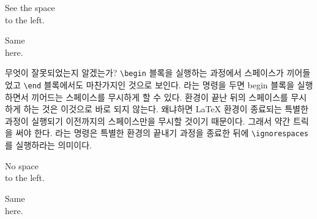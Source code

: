 
\begin{example}
\newenvironment{simple}%
 {\noindent}%
 {\par\noindent}

\begin{simple}
See the space\\to the left.
\end{simple}
Same\\here.
\end{example}

\noindent 무엇이 잘못되었는지 알겠는가? \verb|\begin| 블록을 실행하는 과정에서 스페이스가 끼어들었고 \verb|\end| 블록에서도 마찬가지인 것으로 보인다.
라는 명령을 두면 begin 블록을 실행하면서 끼어드는 스페이스를 무시하게 할 수 있다. 환경이 끝난 뒤의 스페이스를 무시하게 하는 것은 이것으로 바로 되지 않는다. 왜냐하면 \LaTeX{} 환경이 종료되는 특별한 과정이 실행되기 이전까지의 스페이스만을 무시할 것이기 때문이다. 그래서 약간 트릭을 써야 한다. 라는 명령은 특별한 환경의 끝내기 과정을 종료한 뒤에 \verb|\ignorespaces|를 실행하라는 의미이다.


\begin{example}
\newenvironment{correct}%
 {\noindent\ignorespaces}%
 {\par\noindent%
   \ignorespacesafterend}

\begin{correct}
No space\\to the left.
\end{correct}
Same\\here.
\end{example}

